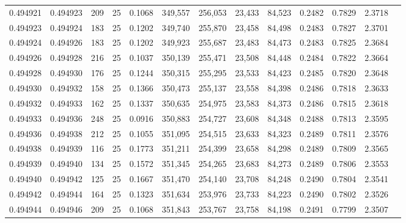 \begin{tabular}{rrrrrrrrrrrrr}
0.494921 & 0.494923 &   209 &  25 &                                     0.1068 & 349,557 & 256,053 &  23,433 &  84,523 & 0.2482 & 0.7829 & 2.3718 \\
0.494923 & 0.494924 &   183 &  25 &                                     0.1202 & 349,740 & 255,870 &  23,458 &  84,498 & 0.2483 & 0.7827 & 2.3701 \\
0.494924 & 0.494926 &   183 &  25 &                                     0.1202 & 349,923 & 255,687 &  23,483 &  84,473 & 0.2483 & 0.7825 & 2.3684 \\
0.494926 & 0.494928 &   216 &  25 &                                     0.1037 & 350,139 & 255,471 &  23,508 &  84,448 & 0.2484 & 0.7822 & 2.3664 \\
0.494928 & 0.494930 &   176 &  25 &                                     0.1244 & 350,315 & 255,295 &  23,533 &  84,423 & 0.2485 & 0.7820 & 2.3648 \\
0.494930 & 0.494932 &   158 &  25 &                                     0.1366 & 350,473 & 255,137 &  23,558 &  84,398 & 0.2486 & 0.7818 & 2.3633 \\
0.494932 & 0.494933 &   162 &  25 &                                     0.1337 & 350,635 & 254,975 &  23,583 &  84,373 & 0.2486 & 0.7815 & 2.3618 \\
0.494933 & 0.494936 &   248 &  25 &                                     0.0916 & 350,883 & 254,727 &  23,608 &  84,348 & 0.2488 & 0.7813 & 2.3595 \\
0.494936 & 0.494938 &   212 &  25 &                                     0.1055 & 351,095 & 254,515 &  23,633 &  84,323 & 0.2489 & 0.7811 & 2.3576 \\
0.494938 & 0.494939 &   116 &  25 &                                     0.1773 & 351,211 & 254,399 &  23,658 &  84,298 & 0.2489 & 0.7809 & 2.3565 \\
0.494939 & 0.494940 &   134 &  25 &                                     0.1572 & 351,345 & 254,265 &  23,683 &  84,273 & 0.2489 & 0.7806 & 2.3553 \\
0.494940 & 0.494942 &   125 &  25 &                                     0.1667 & 351,470 & 254,140 &  23,708 &  84,248 & 0.2490 & 0.7804 & 2.3541 \\
0.494942 & 0.494944 &   164 &  25 &                                     0.1323 & 351,634 & 253,976 &  23,733 &  84,223 & 0.2490 & 0.7802 & 2.3526 \\
0.494944 & 0.494946 &   209 &  25 &                                     0.1068 & 351,843 & 253,767 &  23,758 &  84,198 & 0.2491 & 0.7799 & 2.3507 \\

\end{tabular}
